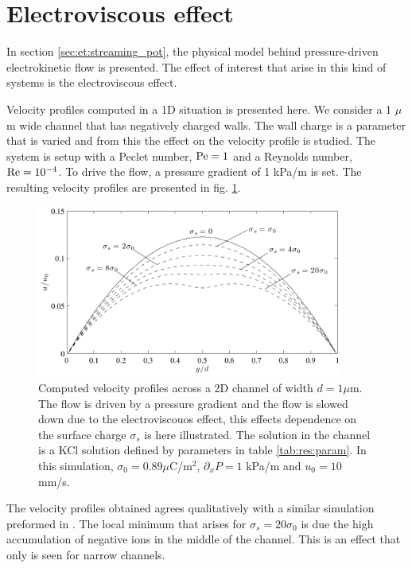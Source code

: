 \section{Electroviscous effect}
In section \ref{sec:et:streaming_pot}, the physical model behind
pressure-driven electrokinetic flow is presented. The effect of
interest that arise in this kind of systems is the electroviscous
effect.

Velocity profiles computed in a 1D situation is presented here. We
consider a 1 $\mu$m wide channel that has negatively charged
walls. The wall charge is a parameter that is varied and from this the
effect on the velocity profile is studied. The system is setup with a
Peclet number, $\mathrm{Pe} = 1$ and a Reynolds number, $\mathrm{Re} = 10^{-4}$. To
drive the flow, a pressure gradient of 1 kPa/m is set. The resulting
velocity profiles are presented in fig. \ref{fig:res:ev}.

\begin{figure}
\begin{center}
\includegraphics[width=0.9\textwidth]{fig/electrovisc.pdf}
\end{center}
\caption{Computed velocity profiles across a 2D channel of width $d =
  1 \mu$m. The flow is driven by a pressure gradient and the flow is
  slowed down due to the electroviscouos effect, this effects
  dependence on the surface charge $\sigma_s$ is here illustrated. The
  solution in the channel is a KCl solution defined by parameters in
  table \ref{tab:res:param}. In this simulation, $\sigma_0 = 0.89
  \mu$C/m$^2$, $\partial_xP = 1$ kPa/m and $u_0 = 10$ mm/s. }
\label{fig:res:ev}
\end{figure}

The velocity profiles obtained agrees qualitatively with a similar
simulation preformed in \cite{ren-elvis-paper}. The local minimum that
arises for $\sigma_s  = 20\sigma_0$ is due the high accumulation of
negative ions in the middle of the channel. This is an effect that
only is seen for narrow channels.

